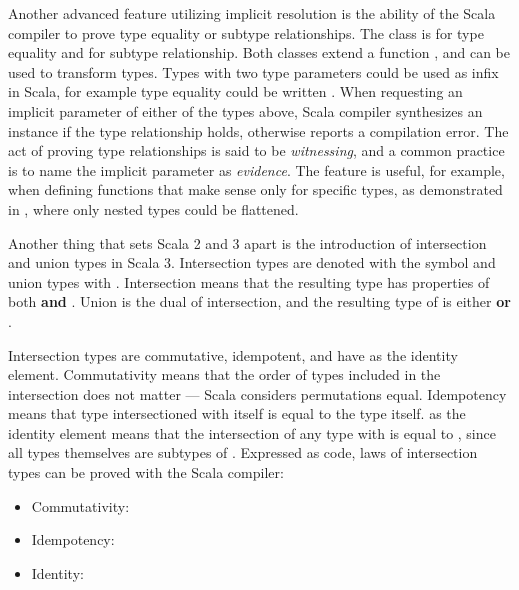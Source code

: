 Another advanced feature utilizing implicit resolution is the ability of the Scala compiler to prove type equality or subtype relationships. The class \inlinescala{=:=[From, To]} is for type equality and \inlinescala{<:<[From, To]} for subtype relationship. Both classes extend a function , and can be used to transform types. Types with two type parameters could be used as infix in Scala, for example type equality could be written . When requesting an implicit parameter of either of the types above, Scala compiler synthesizes an instance if the type relationship holds, otherwise reports a compilation error. The act of proving type relationships is said to be \emph{witnessing}, and a common practice is to name the implicit parameter as \emph{evidence}. The feature is useful, for example, when defining functions that make sense only for specific types, as demonstrated in , where only nested  types could be flattened.



Another thing that sets Scala 2 and 3 apart is the introduction of intersection and union types in Scala 3. Intersection types are denoted with the \inlinecode{&} symbol and union types with \inlinecode{|}. Intersection  means that the resulting type has properties of both  \textbf{and} . Union is the dual of intersection, and the resulting type of  is either  \textbf{or} .

Intersection types are commutative, idempotent, and have  as the identity element. Commutativity means that the order of types included in the intersection does not matter --- Scala considers permutations equal. Idempotency means that type intersectioned with itself is equal to the type itself.  as the identity element means that the intersection of any type  with  is equal to , since all types themselves are subtypes of . Expressed as code, laws of intersection types can be proved with the Scala compiler:
\begin{itemize}
    \item Commutativity: 
    \item Idempotency: 
    \item Identity: 
\end{itemize}

